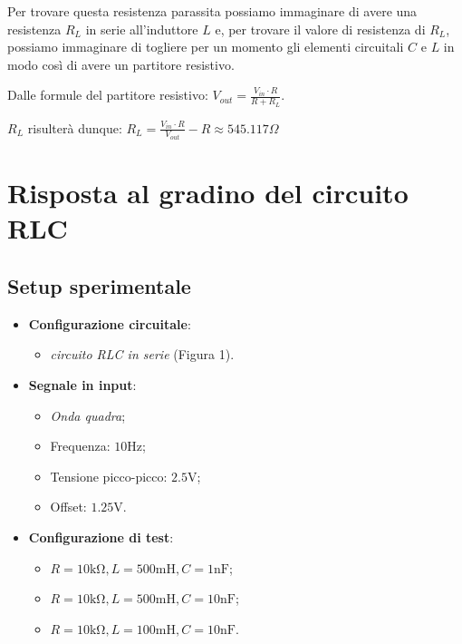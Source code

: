 \documentclass[a4paper,10pt]{article}
\begin{document}
Per trovare questa resistenza parassita possiamo immaginare di avere una resistenza $R_L$ in serie all'induttore $L$ e, per trovare il valore di resistenza di $R_L$, possiamo immaginare di togliere per un momento gli elementi circuitali $C$ e $L$ in modo così di avere un partitore resistivo.

Dalle formule del partitore resistivo: \(V_{out} = \frac{V_{in} \cdot R}{R + R_L}\).

$R_L$ risulterà dunque: \(R_L = \frac{V_{in} \cdot R }{V_{out}} - R \approx 545.117 \Omega \)


\section{Risposta al gradino del circuito RLC}

\begin{multicols}{2}
\subsection{Setup sperimentale}

\begin{itemize}
    \item \textbf{Configurazione circuitale}:
        \begin{itemize}
            \item \textit{circuito RLC in serie} (Figura 1).
        \end{itemize}
    \item \textbf{Segnale in input}:
        \begin{itemize}
            \item \textit{Onda quadra};
            \item Frequenza: \(10 \si{\hertz}\);
            \item Tensione picco-picco: \(2.5 \si{\volt}\);
            \item Offset: \(1.25 \si{\volt}\).
        \end{itemize}
    \item \textbf{Configurazione di test}:
        \begin{itemize}
            \item \(R=10 \si{\kilo \ohm}, L = 500 \si{\milli \henry}, C = 1 \si{\nano \farad}\);
            \item \(R= 10 \si{\kilo \ohm}, L = 500 \si{\milli \henry}, C= 10 \si{\nano \farad}\);
            \item \(R= 10 \si{\kilo \ohm}, L = 100 \si{\milli \henry}, C = 10 \si{\nano \farad}\).
        \end{itemize}
\end{itemize}


\end{multicols}
\end{document}
